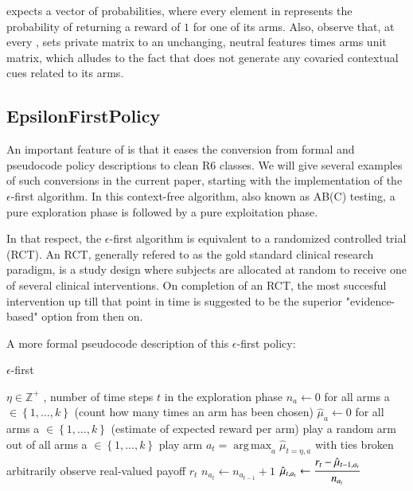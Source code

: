 \documentclass{jss}
\DeclareMathOperator*{\argmax}{arg\,max}
\begin{document}
 expects a  vector of probabilities, where every element in  represents the probability of  returning a reward of $1$ for one of its  arms. Also, observe that, at every ,  sets private  matrix  to an unchanging, neutral  features times  arms unit matrix, which alludes to the fact that  does not generate any covaried contextual cues related to its arms.

\subsection{EpsilonFirstPolicy} \label{epsfirst}

An important feature of  is that it eases the conversion from formal and pseudocode policy descriptions to clean R6 classes. We will give several examples of such conversions in the current paper, starting with the implementation of the $\epsilon$-first algorithm. In this context-free algorithm, also known as AB(C) testing, a pure exploration phase is followed by a pure exploitation phase.

In that respect, the $\epsilon$-first algorithm is equivalent to a randomized controlled trial (RCT). An RCT, generally refered to as the gold standard clinical research paradigm, is a study design where subjects are allocated at random to receive one of several clinical interventions. On completion of an RCT, the most succesful intervention up till that point in time is suggested to be the superior "evidence-based" option from then on.

A more formal pseudocode description of this $\epsilon$-first policy:

\begin{algorithm}[H]
\caption{$\epsilon$-first}
\label{Alg:EpsilonFirst}
\begin{algorithmic}
\REQUIRE \(   \eta \in \mathbb{Z}^{+} \)  , number of time steps $t$ in the exploration phase
\STATE \( n_{a} \leftarrow 0 \) for all arms a \(  \in \left\{ 1, \dots, k \right\} \)  (count how many times an arm has been chosen)
\STATE \( \hat{\mu}_{a} \leftarrow 0 \) for all arms a  \(   \in \left\{ 1, \dots, k \right\} \)  (estimate of expected reward per arm)
	       \STATE play a random arm out of all arms a \(   \in \left\{ 1, \dots, k \right\} \)
	\ELSE
	        \STATE play arm \(a_t = \argmax_a  \hat{\mu}_{t=\eta,a}  \) with ties broken arbitrarily
	\ENDIF
	\STATE observe real-valued payoff $r_t$
	\STATE \( n_{a_{t}} \leftarrow n_{a_{t-1}} + 1  \)
   \STATE \( \hat{\mu}_{t,a_{t}} \leftarrow   \cfrac{r_t - \hat{\mu}_{t-1,a_{t}} }{n_{a_{t}}}   \)
\ENDFOR
\end{algorithmic}
\end{algorithm}
\end{document}
